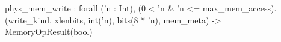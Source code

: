 phys_mem_write : forall ('n : Int), (0 < 'n & 'n <= max_mem_access).
  (write_kind, xlenbits, int('n), bits(8 * 'n), mem_meta) -> MemoryOpResult(bool)